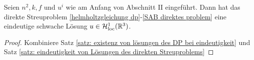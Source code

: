 \begin{cor}\label{kor: direktes streuproblem hat eindeutige schwache lösung}
	Seien \(n^2,k,f\) und \(u^i\) wie am Anfang von Abschnitt II eingeführt. Dann hat das direkte Streuproblem \eqref{helmholtzgleichung dp}-\eqref{SAB direktes problem} eine eindeutige schwache Lösung \(u\in\mathcal{H}_{\mathrm{loc}}^1(\mathbb{R}^3)\).
\end{cor}
\begin{proof}
	Kombiniere Satz \ref{satz: existenz von lösungen des DP bei eindeutigkeit} und Satz \ref{satz: eindeutigkeit von Lösungen des direkten Streuproblems}
\end{proof}





























